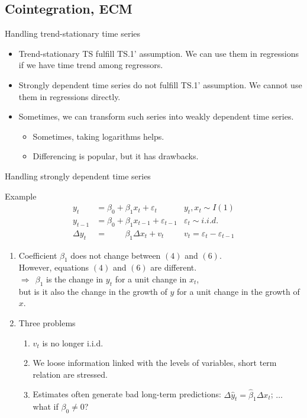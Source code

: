 \documentclass{beamer}
\begin{document}
\subsection{Cointegration, ECM}
\begin{frame}{Handling trend-stationary time series}
\begin{itemize}
\item Trend-stationary TS fulfill TS.1' assumption. We can use them in regressions if we have time trend among regressors.
\medskip
\item Strongly dependent time series do not fulfill TS.1' assumption. We cannot use them in regressions directly.
\medskip
\item Sometimes, we can transform such series into weakly dependent time series.\\ \medskip
\begin{itemize}
    \item Sometimes, taking logarithms helps.
    \medskip
\item Differencing is popular, but it has drawbacks.
\end{itemize}
\end{itemize}
\end{frame}
\begin{frame}{Handling strongly dependent time series}
\vspace{-0.5cm}
\begin{block}{Example}
\vspace{-0.5cm}
\begin{align} 
y_t & = \beta_0 + \beta_1 x_t + \varepsilon_t & y_t, x_t \sim I(1) \\
y_{t-1} & = \beta_0 + \beta_1 x_{t-1} + \varepsilon_{t-1} & \varepsilon_t \sim i.i.d. \\
\Delta y_t & = \qquad \, \beta_1\Delta x_t + v_t  & v_t= \varepsilon_t - \varepsilon_{t-1}
\end{align}
\end{block}
\begin{enumerate}
\item Coefficient $\beta_1$ does not change between $(4)$ and $(6)$.
\\ However, equations $(4)$ and $(6)$ are different.
\\$\Rightarrow~~\beta_1$ is the change in $y_t$ for a unit change in $x_t$, \\but is it also the change in the growth of $y$ for a unit change in the growth of $x$.
\item Three problems 
\begin{enumerate}
\item $v_t$ is no longer i.i.d.
\item We loose information linked with the levels of variables, short term relation are stressed.
\item Estimates often generate bad long-term predictions: 
$ \Delta \hat{y}_t = \hat{\beta}_1 \Delta x_t$; $ \dots $ what if $\beta_0 \neq 0$? 
\end{enumerate}
\end{enumerate}
\end{frame}
\end{document}
